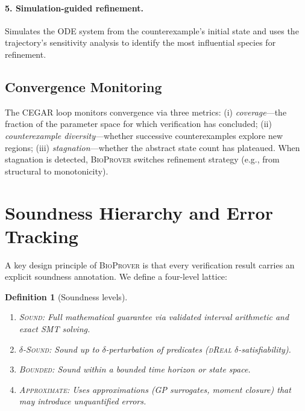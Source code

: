 \documentclass[11pt]{article}
\newtheorem{definition}[theorem]{Definition}
\newcommand{\bioprover}{\textsc{BioProver}}
\newcommand{\cegar}{\textsc{CEGAR}}
\newcommand{\dreal}{\textsc{dReal}}
\begin{document}
\paragraph{5. Simulation-guided refinement.}
Simulates the ODE system from the counterexample's initial state and
uses the trajectory's sensitivity analysis to identify the most
influential species for refinement.

\subsection{Convergence Monitoring}

The \cegar{} loop monitors convergence via three metrics: (i)
\emph{coverage}---the fraction of the parameter space for which
verification has concluded; (ii) \emph{counterexample
diversity}---whether successive counterexamples explore new regions;
(iii) \emph{stagnation}---whether the abstract state count has
plateaued. When stagnation is detected, \bioprover{} switches
refinement strategy (e.g., from structural to monotonicity).

\section{Soundness Hierarchy and Error Tracking}
\label{sec:soundness}

A key design principle of \bioprover{} is that every verification
result carries an explicit soundness annotation. We define a
four-level lattice:

\begin{definition}[Soundness levels]
\label{def:soundness}
\begin{enumerate}[leftmargin=*,itemsep=1pt]
\item \textsc{Sound}: Full mathematical guarantee via validated
  interval arithmetic and exact SMT solving.
\item \textsc{$\delta$-Sound}: Sound up to $\delta$-perturbation of
  predicates (\dreal{} $\delta$-satisfiability).
\item \textsc{Bounded}: Sound within a bounded time horizon or state
  space.
\item \textsc{Approximate}: Uses approximations (GP surrogates,
  moment closure) that may introduce unquantified errors.
\end{enumerate}
\end{definition}
\end{document}
